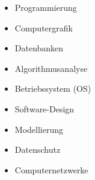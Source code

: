 \documentclass{beamer}
\begin{document}
\begin{frame}
\begin{minipage}{0.45\textwidth}
\begin{itemize}
        \item<2-> Programmierung
        \item<3-> Computergrafik
        \item<4-> Datenbanken
        \item<5-> Algorithmusanalyse
        \item<6-> Betriebssystem (OS)
        \item<7-> Software-Design
        \item<8-> Modellierung
        \item<9-> Datenschutz
        \item<10-> Computernetzwerke
    \end{itemize}
\end{minipage}
\end{frame}
\end{document}
